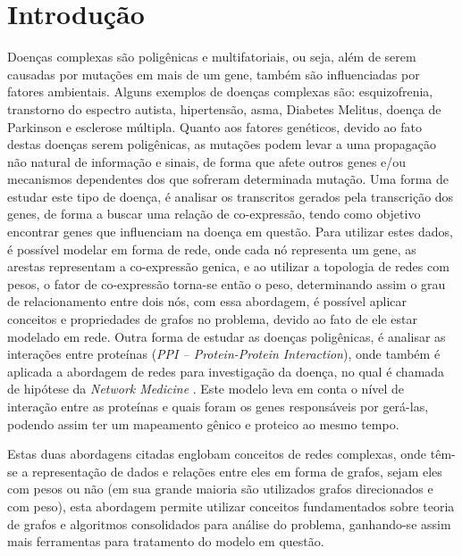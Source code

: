 \newcommand{\itab}[1]{\hspace{0em}\rlap{#1}}
\newcommand{\tab}[1]{\hspace{.2\textwidth}\rlap{#1}}
\chapter[Introdução]{Introdução}


Doenças complexas são poligênicas e multifatoriais, ou seja, além de serem causadas por mutações em mais de um gene, também são influenciadas por fatores ambientais. %
Alguns exemplos de doenças complexas são: esquizofrenia, transtorno do espectro autista, hipertensão, asma, Diabetes Melitus, doença de Parkinson e esclerose múltipla. %
Quanto aos fatores genéticos, devido ao fato destas doenças serem poligênicas, as mutações podem levar a uma propagação não natural de informação e sinais, de forma que afete outros genes e/ou mecanismos dependentes dos que sofreram determinada mutação.
%
Uma forma de estudar este tipo de doença, é analisar os transcritos gerados pela transcrição dos genes, de forma a buscar uma relação de co-expressão, tendo como objetivo encontrar genes que influenciam na doença em questão.
Para utilizar estes dados, é possível modelar em forma de rede, onde cada nó representa um gene, as arestas representam a co-expressão genica, e ao utilizar a topologia de redes com pesos, o fator de co-expressão torna-se então o peso, determinando assim o grau de relacionamento entre dois nós, com essa abordagem, é possível aplicar conceitos e propriedades de grafos no problema, devido ao fato de ele estar modelado em rede.
Outra forma de estudar as doenças poligênicas, é analisar as interações entre proteínas (\textsl{PPI – Protein-Protein Interaction}), onde também é aplicada a abordagem de redes para investigação da doença, no qual é chamada de hipótese da \textsl{Network Medicine} \cite{Barabasi2011}. Este modelo leva em conta o nível de interação entre as proteínas e quais foram os genes responsáveis por gerá-las, podendo assim ter um mapeamento gênico e proteico ao mesmo tempo.

Estas duas abordagens citadas englobam conceitos de redes complexas, onde têm-se a representação de dados e relações entre eles em forma de grafos, sejam eles com pesos ou não (em sua grande maioria são utilizados grafos direcionados e com peso), esta abordagem permite utilizar conceitos fundamentados sobre teoria de grafos e algoritmos consolidados para análise do problema, ganhando-se assim mais ferramentas para tratamento do modelo em questão.


